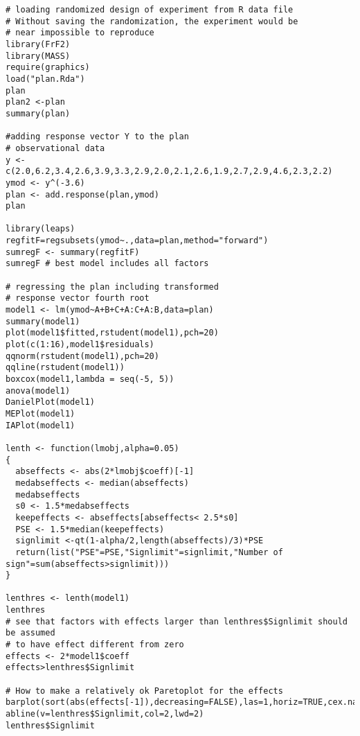 \begin{lstlisting}[caption="Main code"]
# loading randomized design of experiment from R data file
# Without saving the randomization, the experiment would be 
# near impossible to reproduce
library(FrF2)
library(MASS)
require(graphics)
load("plan.Rda")
plan
plan2 <-plan
summary(plan)

#adding response vector Y to the plan 
# observational data
y <- c(2.0,6.2,3.4,2.6,3.9,3.3,2.9,2.0,2.1,2.6,1.9,2.7,2.9,4.6,2.3,2.2)
ymod <- y^(-3.6)
plan <- add.response(plan,ymod)
plan

library(leaps)
regfitF=regsubsets(ymod~.,data=plan,method="forward")
sumregF <- summary(regfitF)
sumregF # best model includes all factors 

# regressing the plan including transformed 
# response vector fourth root
model1 <- lm(ymod~A+B+C+A:C+A:B,data=plan)
summary(model1)
plot(model1$fitted,rstudent(model1),pch=20)
plot(c(1:16),model1$residuals)
qqnorm(rstudent(model1),pch=20)
qqline(rstudent(model1))
boxcox(model1,lambda = seq(-5, 5))
anova(model1)
DanielPlot(model1)
MEPlot(model1)
IAPlot(model1)

lenth <- function(lmobj,alpha=0.05)
{
  abseffects <- abs(2*lmobj$coeff)[-1]
  medabseffects <- median(abseffects)
  medabseffects
  s0 <- 1.5*medabseffects
  keepeffects <- abseffects[abseffects< 2.5*s0]
  PSE <- 1.5*median(keepeffects)
  signlimit <-qt(1-alpha/2,length(abseffects)/3)*PSE
  return(list("PSE"=PSE,"Signlimit"=signlimit,"Number of sign"=sum(abseffects>signlimit)))
}

lenthres <- lenth(model1)
lenthres
# see that factors with effects larger than lenthres$Signlimit should be assumed
# to have effect different from zero
effects <- 2*model1$coeff
effects>lenthres$Signlimit

# How to make a relatively ok Paretoplot for the effects
barplot(sort(abs(effects[-1]),decreasing=FALSE),las=1,horiz=TRUE,cex.names=1.0)
abline(v=lenthres$Signlimit,col=2,lwd=2)
lenthres$Signlimit

\end{lstlisting}
